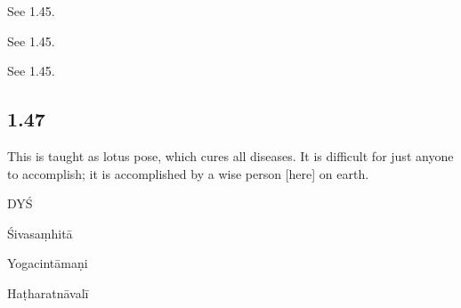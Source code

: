 \begin{ekdosis}
\begin{sources}[hp01_046]
See 1.45.
\end{sources}

\begin{testimonia}[hp01_046]
See 1.45.
\end{testimonia}

\begin{philcomm}[hp01_046]
See 1.45.
\end{philcomm}

\subsection*{1.47}
\begin{translation}[hp01_047]
This is taught as lotus pose, which cures all diseases. It is difficult for just anyone to accomplish; it is accomplished by a wise person [here] on earth.
\end{translation}

\begin{sources}[hp01_047]
DYŚ

\begin{versinnote}
\end{versinnote}

Śivasaṃhitā

\begin{versinnote}
\end{versinnote}

\end{sources}

\begin{testimonia}[hp01_047]
Yogacintāmaṇi

\begin{versinnote}
\end{versinnote}

Haṭharatnāvalī

\begin{versinnote}
\end{versinnote}


\end{testimonia}
\end{ekdosis}

